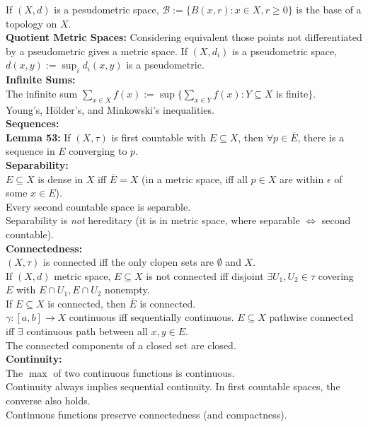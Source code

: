 \documentclass[11pt]{article}
\newcommand{\B}{\mathcal{B}}
\begin{document}
If $(X,d)$ is a pesudometric space, $\B := \{B(x,r) : x \in X, r \geq 0\}$ is
the base of a topology on $X$. \\
{\bf Quotient Metric Spaces:} Considering equivalent those points not
differentiated by a pseudometric gives a metric space.
If $(X,d_i)$ is a pseudometric space, $d(x,y) := \sup_i d_i(x,y)$ is a
pseudometric. \\
{\bf Infinite Sums:} \\
The infinite sum $\sum_{x \in X} f(x) := \sup\{\sum_{x \in Y} f(x)
 : Y \subseteq X$ is finite$\}.$ \\
Young's, H\"older's, and Minkowski's inequalities. \\ %
{\bf Sequences:} \\
{\bf Lemma 53:} If $(X,\tau)$ is first countable with $E \subseteq X$, then
$\forall p \in \overline{E}$, there is a sequence in $E$ converging to $p$. \\
{\bf Separability:} \\
$E \subseteq X$ is dense in $X$ iff $\overline{E} = X$ (in a metric space, iff
all $p \in X$ are within $\epsilon$ of some $x \in E$). \\
Every second countable space is separable. \\
Separability is \emph{not} hereditary (it is in metric space, where separable
$\Leftrightarrow$ second countable). \\
{\bf Connectedness:} \\
$(X,\tau)$ is connected iff the only clopen sets are $\emptyset$ and $X$. \\
If $(X,d)$ metric space, $E \subseteq X$ is not connected iff disjoint
$\exists U_1,U_2 \in \tau$ covering $E$ with $E \cap U_1,E \cap U_2$ nonempty.
\\
If $E \subseteq X$ is connected, then $\overline{E}$ is connected. \\
$\gamma: [a,b] \rightarrow X$ continuous iff sequentially continuous.
$E \subseteq X$ pathwise connected iff $\exists$ continuous path between
all $x,y \in E$. \\
The connected components of a closed set are closed. \\
{\bf Continuity:} \\
The $\max$ of two continuous functions is continuous. \\
Continuity always implies sequential continuity. In first countable spaces,
the converse also holds. \\
Continuous functions preserve connectedness (and compactness). \\
\end{document}
